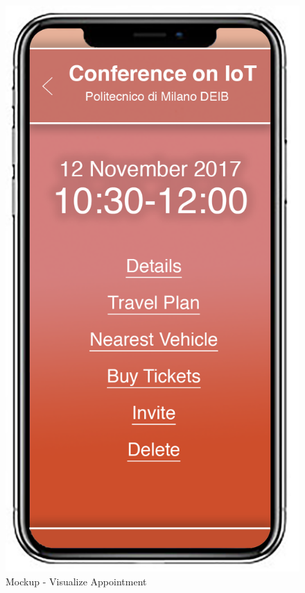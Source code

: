 \begin{figure}[H]
	\begin{minipage}{0.5\textwidth}
		\centerline{\includegraphics[width=0.3\paperwidth]{Images/VisualizeAppointment}}
		\caption{Mockup - Visualize Appointment}
	\end{minipage}
	\begin{minipage}{0.5\textwidth}

\end{minipage}
\end{figure}
